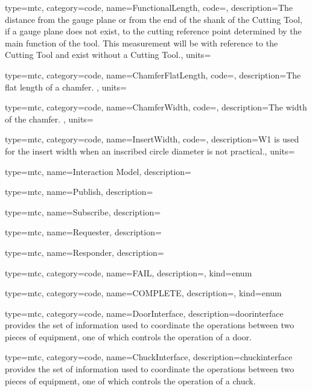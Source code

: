 {
  type=mtc,
  category=code,
  name={FunctionalLength},
  code=,
  description={The distance from the gauge plane or from the end of the shank of the Cutting Tool, if a gauge plane does not exist, to the cutting reference point determined by the main function of the tool. This measurement will be with reference to the Cutting Tool and \MUSTNOT exist without a Cutting Tool.},
  units=
}


{
  type=mtc,
  category=code,
  name={ChamferFlatLength},
  code=,
  description={The flat length of a chamfer. },
  units=
}


{
  type=mtc,
  category=code,
  name={ChamferWidth},
  code=,
  description={The width of the chamfer. },
  units=
}


{
  type=mtc,
  category=code,
  name={InsertWidth},
  code=,
  description={W1 is used for the insert width when an inscribed circle diameter is not practical.},
  units=
}


{
  type=mtc,
  name={Interaction Model},
  description={}
}


{
  type=mtc,
  name={Publish},
  description={}
}


{
  type=mtc,
  name={Subscribe},
  description={}
}


{
  type=mtc,
  name={Requester},
  description={}
}


{
  type=mtc,
  name={Responder},
  description={}
}


{
  type=mtc,
  category=code,
  name={FAIL},
  description={},
  kind={enum}
}


{
  type=mtc,
  category=code,
  name={COMPLETE},
  description={},
  kind={enum}
}


{
  type=mtc,
  category=code,
  name={DoorInterface},
  description={\gls{doorinterface} provides the set of information used to coordinate the operations between two pieces of equipment, one of which controls the operation of a door. }
}


{
  type=mtc,
  category=code,
  name={ChuckInterface},
  description={\gls{chuckinterface} provides the set of information used to coordinate the operations between two pieces of equipment, one of which controls the operation of a chuck.  }
}


